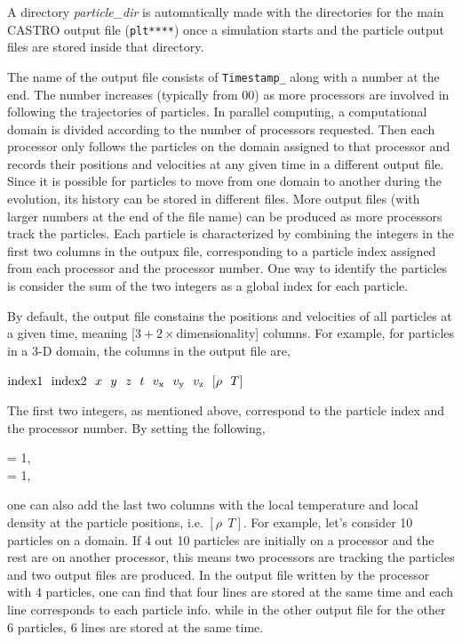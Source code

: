 \noindent A directory {\em particle\_dir} is automatically made with the directories for the main CASTRO output file ({\tt plt****}) once a simulation starts and the particle output files are stored inside that directory.

\vspace{0.05in}
\noindent The name of the output file consists of {\tt Timestamp\_} along with a number at the end. The number increases (typically from 00) as more processors are involved in following the trajectories of particles. In parallel computing, a computational domain is divided according to the number of processors requested. Then each processor only follows the particles on the domain assigned to that processor and records their positions and velocities at any given time in a different output file. Since it is possible for particles to move from one domain to another during the evolution, its history can be stored in different files. More output files (with larger numbers at the end of the file name) can be produced as more processors track the particles. Each particle is characterized by combining the integers in the first two columns in the outpux file, corresponding to a particle index assigned from each processor and the processor number. One way to identify the particles is consider the sum of the two integers as a global index for each particle. 

\vspace{0.05in}
\noindent By default, the output file constains the positions and velocities of all particles at a given time, meaning [$3+ 2\times$dimensionality] columns. For example, for particles in a 3-D domain, the columns in the output file are, 

\vspace{0.1in}
${\rm index1}~~{\rm index2}~~x~~ y~~ z~~ t~~ v_{\rm x} ~~v_{\rm y}~~ v_{\rm z}~~ [\rho ~~ T]$
\vspace{0.1in}

\noindent The first two integers, as mentioned above, correspond to the particle index and the processor number. By setting the following,

\vspace{0.1in}
= 1,\\
     = 1,
\vspace{0.1in}

\noindent one can also add the last two columns with the local temperature and local density at the particle positions, i.e. $[\rho ~~ T]$. For example, let's consider 10 particles on a domain.  If 4 out 10 particles are initially on a processor and the rest are on another processor, this means two processors are tracking the particles and two output files are produced. In the output file written by the processor with 4 particles, one can find that four lines are stored at the same time and each line corresponds to each particle info. while in the other output file for the other 6 particles, 6 lines are stored at the same time. 



